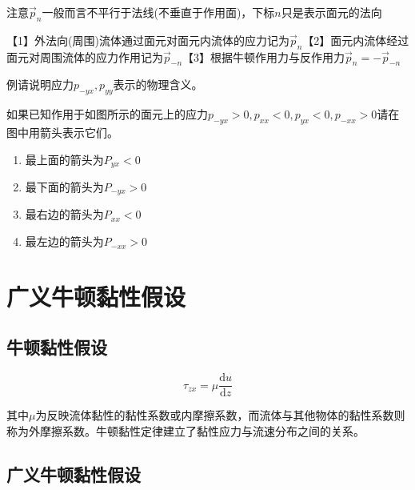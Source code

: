 \documentclass[a4paper,oneside]{ctexbook}
\begin{document}
注意\(\overrightarrow{p}_n\)一般而言不平行于法线(不垂直于作用面)，下标\(n\)只是表示面元的法向

【1】外法向(周围)流体通过面元对面元内流体的应力记为\(\overrightarrow{p}_n\)【2】面元内流体经过面元对周围流体的应力作用记为\(\overrightarrow{p}_{-n}\)【3】根据牛顿作用力与反作用力\(\overrightarrow{p}_n=-\overrightarrow{p}_{-n}\)

例请说明应力\(p_{-yx},p_{yy}\)表示的物理含义。

如果已知作用于如图所示的面元上的应力\(p_{-yx}>0,p_{xx}<0,p_{yx}<0,p_{-xx}>0\)请在图中用箭头表示它们。
\begin{figure}[htbp]
    \centering
\end{figure}
\begin{enumerate}
    \item 最上面的箭头为\(P_{yx}<0\)
    \item 最下面的箭头为\(P_{-yx}>0\)
    \item 最右边的箭头为\(P_{xx}<0\)
    \item 最左边的箭头为\(P_{-xx}>0\)
\end{enumerate}

\section{广义牛顿黏性假设}

\subsection{牛顿黏性假设}
\begin{equation}
    \tau_{zx}=\mu\dfrac{\mathrm{d}u}{\mathrm{d}z}
\end{equation}

其中\(\mu\)为反映流体黏性的黏性系数或内摩擦系数，而流体与其他物体的黏性系数则称为外摩擦系数。牛顿黏性定律建立了黏性应力与流速分布之间的关系。

\subsection{广义牛顿黏性假设}
\end{document}
